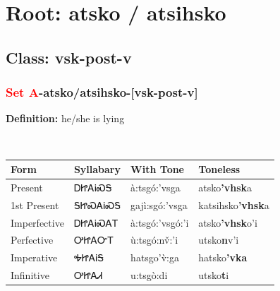 \needspace{4in}
\section*{Root: atsko / atsihsko}
\nopagebreak
{}
\needspace{3in}
\subsection*{Class: vsk-post-v}
\nopagebreak
\needspace{2in}
\subsubsection*{\textcolor{Red}{Set A}{-}\textbf{atsko/atsihsko}{-}[vsk-post-v]}
\nopagebreak
\textbf{Definition: } he/she is lying
\\[0.5em]
\begin{tabularx}{\textwidth}{l X X X}%
\toprule%
\textbf{Form}&\textbf{Syllabary}&\textbf{With Tone}&\textbf{Toneless}\\%
\midrule%
Present&ᎠᏥᎪᎥᏍᎦ&à:tsgó:’vsga&atsko\textbf{'vhsk}a\\%
1st Present&ᎦᏥᏍᎪᎥᏍᎦ&gajì:sgó:’vsga&katsihsko\textbf{'vhsk}a\\%
Imperfective&ᎠᏥᎪᎥᏍᎪᎢ&à:tsgó:’vsgó:’i&atsko\textbf{'vhsk}o'i\\%
Perfective&ᎤᏥᎪᏅᎢ&ù:tsgó:nv̌:’i&utsko\textbf{n}v'i\\%
Imperative&ᎭᏥᎪᎥᎦ&hatsgo’v̀:ga&hatsko\textbf{'vka}\\%
Infinitive&ᎤᏥᎪᏗ&u:tsgò:di&utsko\textbf{t}i\\%
\bottomrule%
\end{tabularx}
\\[1em]
